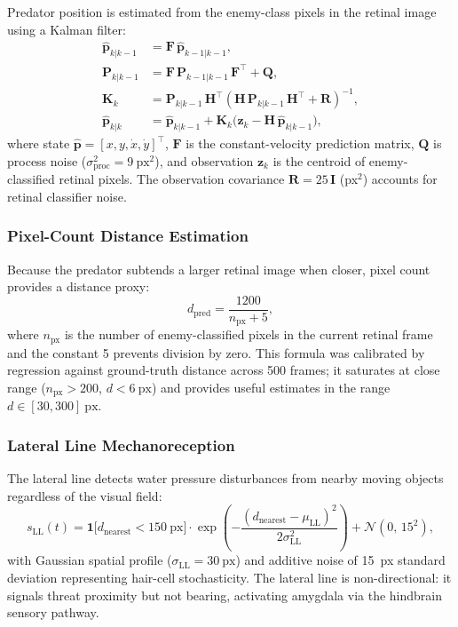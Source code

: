 \documentclass[11pt,a4paper]{article}
\begin{document}
Predator position is estimated from the enemy-class pixels in the
retinal image using a Kalman filter:
\begin{equation}\label{eq:kalman}
\begin{aligned}
  \hat{\mathbf{p}}_{k|k-1} &= \mathbf{F}\,\hat{\mathbf{p}}_{k-1|k-1}, \\
  \mathbf{P}_{k|k-1} &= \mathbf{F}\,\mathbf{P}_{k-1|k-1}\,\mathbf{F}^\top + \mathbf{Q}, \\
  \mathbf{K}_k &= \mathbf{P}_{k|k-1}\,\mathbf{H}^\top
    (\mathbf{H}\,\mathbf{P}_{k|k-1}\,\mathbf{H}^\top + \mathbf{R})^{-1}, \\
  \hat{\mathbf{p}}_{k|k} &= \hat{\mathbf{p}}_{k|k-1}
    + \mathbf{K}_k\bigl(\mathbf{z}_k - \mathbf{H}\,\hat{\mathbf{p}}_{k|k-1}\bigr),
\end{aligned}
\end{equation}
where state $\hat{\mathbf{p}} = [x, y, \dot{x}, \dot{y}]^\top$,
$\mathbf{F}$ is the constant-velocity prediction matrix,
$\mathbf{Q}$ is process noise ($\sigma_\mathrm{proc}^2 = 9~\text{px}^2$),
and observation $\mathbf{z}_k$ is the centroid of enemy-classified retinal pixels.
The observation covariance $\mathbf{R} = 25\,\mathbf{I}$ (px$^2$) accounts
for retinal classifier noise.

\subsubsection{Pixel-Count Distance Estimation}

Because the predator subtends a larger retinal image when closer,
pixel count provides a distance proxy:
\begin{equation}\label{eq:pixel_distance}
  d_\mathrm{pred} = \frac{1200}{n_\mathrm{px} + 5},
\end{equation}
where $n_\mathrm{px}$ is the number of enemy-classified pixels in the
current retinal frame and the constant 5 prevents division by zero.
This formula was calibrated by regression against ground-truth distance
across 500 frames; it saturates at close range ($n_\mathrm{px} > 200$,
$d < 6~\text{px}$) and provides useful estimates in the range
$d \in [30, 300]~\text{px}$.

\subsubsection{Lateral Line Mechanoreception}

The lateral line detects water pressure disturbances from nearby
moving objects regardless of the visual field:
\begin{equation}\label{eq:lateral_line}
  s_\mathrm{LL}(t) = \mathbf{1}\bigl[d_\mathrm{nearest} < 150~\text{px}\bigr]
    \cdot \exp\!\left(-\frac{(d_\mathrm{nearest} - \mu_\mathrm{LL})^2}{2\sigma_\mathrm{LL}^2}\right)
    + \mathcal{N}(0,\,15^2),
\end{equation}
with Gaussian spatial profile ($\sigma_\mathrm{LL} = 30~\text{px}$)
and additive noise of 15~px standard deviation representing hair-cell
stochasticity.
The lateral line is non-directional: it signals threat proximity
but not bearing, activating amygdala via the hindbrain sensory pathway.
\end{document}
